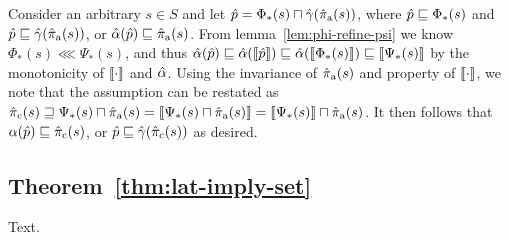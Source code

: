 Consider an arbitrary $s \in S$ and let $\hat p = \Phi_{*}(s) \sqcap \hat{\gamma}(\operatorname{\hat{\pi}_{\textrm{a}}}(s))$, where $\hat p \sqsubseteq \Phi_{*}(s)$ and $\hat p \sqsubseteq \hat{\gamma}(\operatorname{\hat{\pi}_{\textrm{a}}}(s))$, or $\hat{\alpha}(\hat p) \sqsubseteq \operatorname{\hat{\pi}_{\textrm{a}}}(s)$. From lemma~\ref{lem:phi-refine-psi} we know $\Phi_{*}(s) \lll \Psi_{*}(s)$, and thus $\hat{\alpha}(\hat p) \sqsubseteq \hat{\alpha}(\llbracket \hat p \rrbracket) \sqsubseteq \hat{\alpha}(\llbracket \Phi_{*}(s) \rrbracket) \sqsubseteq \llbracket \Psi_{*}(s) \rrbracket$ by the monotonicity of $\llbracket \cdot \rrbracket$ and $\hat{\alpha}$. Using the invariance of $\operatorname{\hat{\pi}_{\textrm{a}}}(s)$ and property  of $\llbracket \cdot \rrbracket$, we note that the assumption can be restated as $\operatorname{\hat{\pi}_{\textrm{c}}}(s) \sqsupseteq \Psi_{*}(s) \sqcap \operatorname{\hat{\pi}_{\textrm{a}}}(s) = \llbracket \Psi_{*}(s) \sqcap \operatorname{\hat{\pi}_{\textrm{a}}}(s) \rrbracket = \llbracket \Psi_{*}(s) \rrbracket \sqcap \operatorname{\hat{\pi}_{\textrm{a}}}(s)$. It then follows that $\alpha(\hat p) \sqsubseteq \operatorname{\hat{\pi}_{\textrm{c}}}(s)$, or $\hat p \sqsubseteq \hat{\gamma}(\operatorname{\hat{\pi}_{\textrm{c}}}(s))$ as desired. %

\subsection{Theorem~\ref{thm:lat-imply-set}}

Text.
